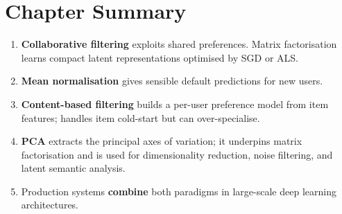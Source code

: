 \section*{Chapter Summary}

\begin{enumerate}
\item \textbf{Collaborative filtering} exploits shared preferences. Matrix
  factorisation learns compact latent representations optimised by SGD or ALS.
\item \textbf{Mean normalisation} gives sensible default predictions for new
  users.
\item \textbf{Content-based filtering} builds a per-user preference model from
  item features; handles item cold-start but can over-specialise.
\item \textbf{PCA} extracts the principal axes of variation; it underpins matrix
  factorisation and is used for dimensionality reduction, noise filtering, and
  latent semantic analysis.
\item Production systems \textbf{combine} both paradigms in large-scale deep
  learning architectures.
\end{enumerate}
